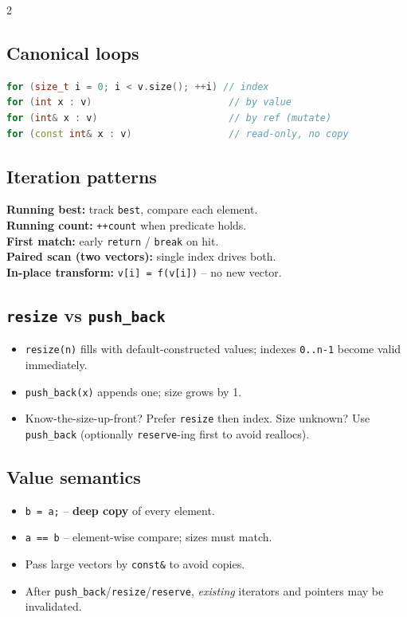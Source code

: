 \documentclass[10pt]{article}
\begin{document}
\begin{multicols}{2}
\subsection*{Canonical loops}
\begin{lstlisting}[language=C++]
for (size_t i = 0; i < v.size(); ++i) // index
for (int x : v)                        // by value
for (int& x : v)                       // by ref (mutate)
for (const int& x : v)                 // read-only, no copy
\end{lstlisting}

\subsection*{Iteration patterns}
\textbf{Running best:} track \texttt{best}, compare each element.\\
\textbf{Running count:} \texttt{++count} when predicate holds.\\
\textbf{First match:} early \texttt{return} / \texttt{break} on hit.\\
\textbf{Paired scan (two vectors):} single index drives both.\\
\textbf{In-place transform:} \texttt{v[i] = f(v[i])} -- no new vector.

\subsection*{\texttt{resize} vs \texttt{push\_back}}
\begin{itemize}
    \item \texttt{resize(n)} fills with default-constructed values;
    indexes \texttt{0..n-1} become valid immediately.
    \item \texttt{push\_back(x)} appends one; size grows by 1.
    \item Know-the-size-up-front? Prefer \texttt{resize} then index.
    Size unknown? Use \texttt{push\_back} (optionally
    \texttt{reserve}-ing first to avoid reallocs).
\end{itemize}

\columnbreak

\subsection*{Value semantics}
\begin{itemize}
    \item \texttt{b = a;} -- \textbf{deep copy} of every element.
    \item \texttt{a == b} -- element-wise compare; sizes must match.
    \item Pass large vectors by \texttt{const\&} to avoid copies.
    \item After \texttt{push\_back}/\texttt{resize}/\texttt{reserve},
    \emph{existing} iterators and pointers may be invalidated.
\end{itemize}


\end{multicols}
\end{document}

